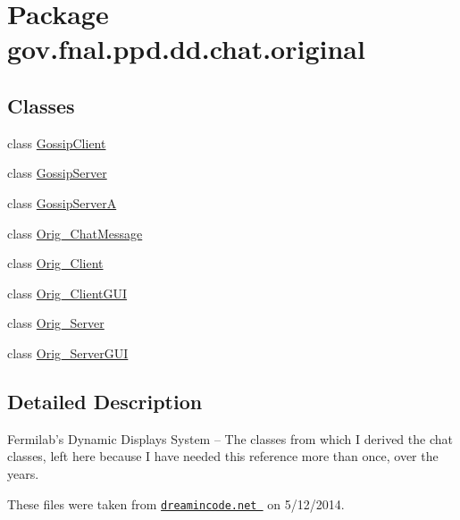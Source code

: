 \hypertarget{namespacegov_1_1fnal_1_1ppd_1_1dd_1_1chat_1_1original}{\section{Package gov.\-fnal.\-ppd.\-dd.\-chat.\-original}
\label{namespacegov_1_1fnal_1_1ppd_1_1dd_1_1chat_1_1original}
}
\subsection*{Classes}
\begin{DoxyCompactItemize}
\item 
class \hyperlink{classgov_1_1fnal_1_1ppd_1_1dd_1_1chat_1_1original_1_1GossipClient}{Gossip\-Client}
\item 
class \hyperlink{classgov_1_1fnal_1_1ppd_1_1dd_1_1chat_1_1original_1_1GossipServer}{Gossip\-Server}
\item 
class \hyperlink{classgov_1_1fnal_1_1ppd_1_1dd_1_1chat_1_1original_1_1GossipServerA}{Gossip\-Server\-A}
\item 
class \hyperlink{classgov_1_1fnal_1_1ppd_1_1dd_1_1chat_1_1original_1_1Orig__ChatMessage}{Orig\-\_\-\-Chat\-Message}
\item 
class \hyperlink{classgov_1_1fnal_1_1ppd_1_1dd_1_1chat_1_1original_1_1Orig__Client}{Orig\-\_\-\-Client}
\item 
class \hyperlink{classgov_1_1fnal_1_1ppd_1_1dd_1_1chat_1_1original_1_1Orig__ClientGUI}{Orig\-\_\-\-Client\-G\-U\-I}
\item 
class \hyperlink{classgov_1_1fnal_1_1ppd_1_1dd_1_1chat_1_1original_1_1Orig__Server}{Orig\-\_\-\-Server}
\item 
class \hyperlink{classgov_1_1fnal_1_1ppd_1_1dd_1_1chat_1_1original_1_1Orig__ServerGUI}{Orig\-\_\-\-Server\-G\-U\-I}
\end{DoxyCompactItemize}


\subsection{Detailed Description}
Fermilab's Dynamic Displays System -- The classes from which I derived the chat classes, left here because I have needed this reference more than once, over the years. 

These files were taken from \href{http://www.dreamincode.net/forums/topic/259777-a-simple-chat-program-with-clientserver-gui-optional/}{\tt dreamincode.\-net } on 5/12/2014.

